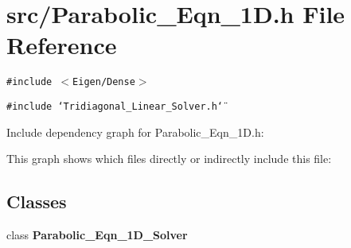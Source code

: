 \section{src/Parabolic\_\-Eqn\_\-1D.h File Reference}
\label{Parabolic__Eqn__1D_8h}
{\tt \#include $<$Eigen/Dense$>$}\par
{\tt \#include \char`\"{}Tridiagonal\_\-Linear\_\-Solver.h\char`\"{}}\par


Include dependency graph for Parabolic\_\-Eqn\_\-1D.h:

This graph shows which files directly or indirectly include this file:\subsection*{Classes}
\begin{CompactItemize}
\item 
class \bf{Parabolic\_\-Eqn\_\-1D\_\-Solver}
\end{CompactItemize}

